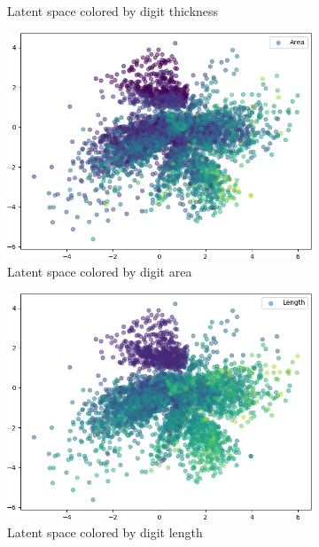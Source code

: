 \begin{figure}[H]
\begin{subfigure}{.32\textwidth}
        \caption{Latent space colored by digit thickness}
    \end{subfigure}
    \hfill
    \begin{subfigure}{.32\textwidth}
        \includegraphics[width=\textwidth]{images/latent_spaces/mnist/vae_gan/embeddings_mu_2.png}
        \caption{Latent space colored by digit area}
    \end{subfigure}
    \hfill
    \begin{subfigure}{.24\textwidth}
        \includegraphics[width=\textwidth]{images/latent_spaces/mnist/vae_gan/embeddings_mu_3.png}
        \caption{Latent space colored by digit length}
    \end{subfigure}
    \hfill
    \begin{subfigure}{.24\textwidth}

\end{subfigure}
\end{figure}
